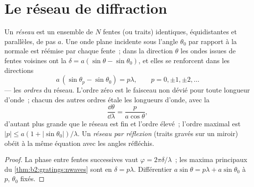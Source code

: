 \section{Le réseau de diffraction}

\begin{proposition}\label{prop:b2:gratings:equation}
Un \emph{réseau} est un ensemble de $N$ fentes (ou traits) identiques,
équidistantes et parallèles, de pas $a$. Une onde plane incidente sous l'angle $\theta_0$
par rapport à la normale est réémise par chaque fente~; dans la direction $\theta$ les
ondes issues de fentes voisines ont la  $\delta = a(\sin\theta
- \sin\theta_0)$, et elles se renforcent dans les directions
\[
a\,(\sin\theta_p - \sin\theta_0) = p\lambda , \qquad p = 0, \pm1, \pm2, \dots
\]
--- les \emph{ordres} du réseau. L'ordre zéro est le faisceau non dévié
pour toute longueur d'onde~; chacun des autres ordres étale les longueurs d'onde,
avec la \emph{}
\[
\frac{\dd\theta}{\dd\lambda} = \frac{p}{a\cos\theta} ,
\]
d'autant plus grande que le réseau est fin et l'ordre élevé~; l'ordre maximal est
$|p| \le a(1 + |\sin\theta_0|)/\lambda$. Un \emph{réseau par réflexion} (traits gravés
sur un miroir) obéit à la même équation avec les angles réfléchis.
\end{proposition}

\begin{proof}
La phase entre fentes successives vaut $\varphi = 2\pi\delta/\lambda$~; les maxima
principaux du \cref{thm:b2:gratings:nwaves} sont en $\delta = p\lambda$.
Différentier $a\sin\theta = p\lambda + a\sin\theta_0$ à $p$, $\theta_0$ fixés.
\end{proof}

